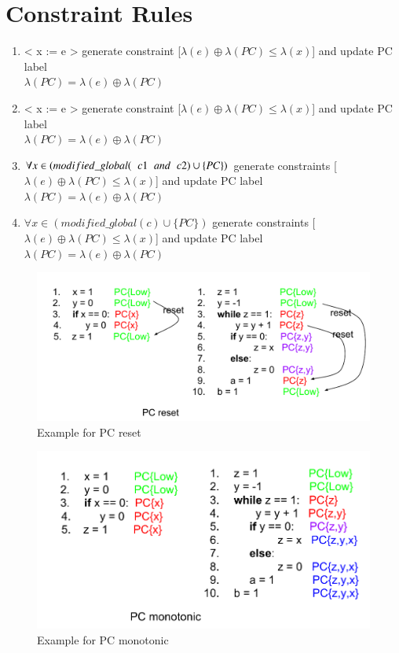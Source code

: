 \section{Constraint Rules}
\begin{enumerate}
	\item < x := e > generate constraint [$\lambda(e)\oplus\lambda(PC)\le\lambda(x)$] and update PC label\\ $\lambda(PC) = \lambda(e)\oplus\lambda(PC)$ 
	\item < x := e > generate constraint [$\lambda(e)\oplus\lambda(PC)\le\lambda(x)$] and update PC label\\ $\lambda(PC) = \lambda(e)\oplus\lambda(PC)$ 
	\item < if e then c1 else c2>  $\forall  x \in ( modified\_global(\hspace{0.2cm} c1 \hspace{0.2cm}and \hspace{0.2cm} c2) \cup \{PC\} )$ generate constraints [$\lambda(e)\oplus\lambda(PC)\le\lambda(x)$] and update PC label $\lambda(PC) = \lambda(e)\oplus\lambda(PC)$
		
	\item < while e do c > $\forall  x \in ( modified\_global(c) \cup \{PC\} )$ generate constraints [$\lambda(e)\oplus\lambda(PC)\le\lambda(x)$] and update PC label $\lambda(PC) = \lambda(e)\oplus\lambda(PC)$
\end{enumerate}

\begin{figure}
	\includegraphics[width=1\textwidth]{PC_reset.pdf}
	\centering
	\caption{Example for PC reset}
	\label{fig:pcreset}
\end{figure}
\begin{figure}
	\includegraphics[width=1\textwidth]{PC_monotonic.pdf}
	\centering
	\caption{Example for PC monotonic}
	\label{fig:pcreset}
\end{figure}
